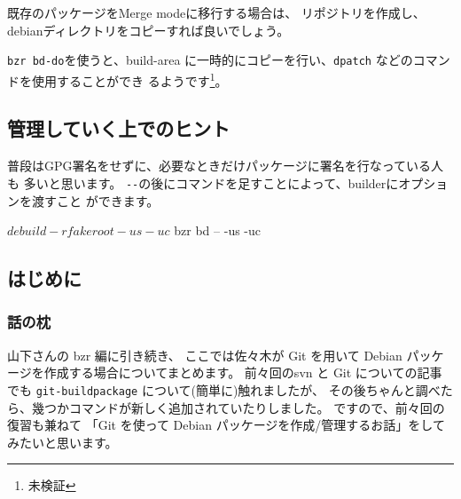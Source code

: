 \documentclass[mingoth,a4paper]{jsarticle}
\begin{document}
既存のパッケージをMerge modeに移行する場合は、
リポジトリを作成し、debianディレクトリをコピーすれば良いでしょう。



\verb|bzr bd-do|を使うと、build-area
に一時的にコピーを行い、\verb|dpatch| などのコマンドを使用することができ
るようです\footnote{未検証}。

\subsection{管理していく上でのヒント}

普段はGPG署名をせずに、必要なときだけパッケージに署名を行なっている人も
多いと思います。
\verb|--|の後にコマンドを足すことによって、builderにオプションを渡すこと
ができます。

\begin{commandline}
 $ debuild -rfakeroot -us -uc
 $ bzr bd -- -us -uc
\end{commandline}
\clearpage


\subsection*{はじめに}
\subsubsection*{話の枕}

山下さんの bzr 編に引き続き、
ここでは佐々木が Git を用いて
Debian パッケージを作成する場合についてまとめます。
前々回のsvn と Git についての記事でも \texttt{git-buildpackage}
について(簡単に)触れましたが、
その後ちゃんと調べたら、幾つかコマンドが新しく追加されていたりしました。
ですので、前々回の復習も兼ねて
「Git を使って Debian パッケージを作成/管理するお話」をしてみたいと思います。
\end{document}
